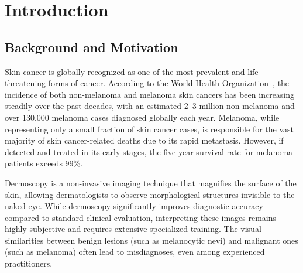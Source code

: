 \documentclass[11pt,a4paper]{report}
\begin{document}
\begin{acronym}[ISIC]
\end{acronym}

\chapter{Introduction}

\section{Background and Motivation}

Skin cancer is globally recognized as one of the most prevalent and life-threatening forms of cancer. According to the World Health Organization~\cite{who2023skin}, the incidence of both non-melanoma and melanoma skin cancers has been increasing steadily over the past decades, with an estimated 2--3 million non-melanoma and over 130,000 melanoma cases diagnosed globally each year. Melanoma, while representing only a small fraction of skin cancer cases, is responsible for the vast majority of skin cancer-related deaths due to its rapid metastasis. However, if detected and treated in its early stages, the five-year survival rate for melanoma patients exceeds 99\%.

Dermoscopy is a non-invasive imaging technique that magnifies the surface of the skin, allowing dermatologists to observe morphological structures invisible to the naked eye. While dermoscopy significantly improves diagnostic accuracy compared to standard clinical evaluation, interpreting these images remains highly subjective and requires extensive specialized training. The visual similarities between benign lesions (such as melanocytic nevi) and malignant ones (such as melanoma) often lead to misdiagnoses, even among experienced practitioners.
\end{document}
